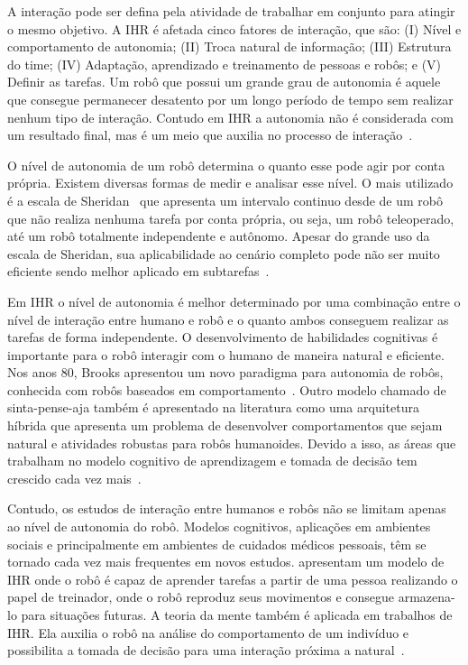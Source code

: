 A interação pode ser defina pela atividade de trabalhar em conjunto para atingir o mesmo objetivo. A IHR é afetada cinco fatores de interação, que são: (I) Nível e comportamento de autonomia; (II) Troca natural de informação; (III) Estrutura do time; (IV) Adaptação, aprendizado e treinamento de pessoas e robôs; e (V) Definir as tarefas. Um robô que possui um grande grau de autonomia é aquele que consegue permanecer desatento por um longo período de tempo sem realizar nenhum tipo de interação. Contudo em IHR a autonomia não é considerada com um resultado final, mas é um meio que auxilia no processo de interação~\cite{goodrich:2007, weiss:2010}.

O nível de autonomia de um robô determina o quanto esse pode agir por conta própria. Existem diversas formas de medir e analisar esse nível. O mais utilizado é a escala de Sheridan~\cite{sheridan:1978} que apresenta um intervalo continuo desde de um robô que não realiza nenhuma tarefa por conta própria, ou seja, um robô teleoperado, até um robô totalmente independente e autônomo. Apesar do grande uso da escala de Sheridan, sua aplicabilidade ao cenário completo pode não ser muito eficiente sendo melhor aplicado em subtarefas~\cite{goodrich:2007, weiss:2010}.

Em IHR o nível de autonomia é melhor determinado por uma combinação entre o nível de interação entre humano e robô e o quanto ambos conseguem realizar as tarefas de forma independente. O desenvolvimento de habilidades cognitivas é importante para o robô interagir com o humano de maneira natural e eficiente. Nos anos 80, Brooks apresentou um novo paradigma para autonomia de robôs, conhecida com robôs baseados em comportamento~\cite{brooks:1986, brooks:1991}. Outro modelo chamado de sinta-pense-aja também é apresentado na literatura como uma arquitetura híbrida que apresenta um problema de desenvolver comportamentos que sejam natural e atividades robustas para robôs humanoides. Devido a isso, as áreas que trabalham no modelo cognitivo de aprendizagem e tomada de decisão tem crescido cada vez mais~\cite{goodrich:2007}.

Contudo, os estudos de interação entre humanos e robôs não se limitam apenas ao nível de autonomia do robô. Modelos cognitivos, aplicações em ambientes sociais e principalmente em ambientes de cuidados médicos pessoais, têm se tornado cada vez mais frequentes em novos estudos.  apresentam um modelo de IHR onde o robô é capaz de aprender tarefas a partir de uma pessoa realizando o papel de treinador, onde o robô reproduz seus movimentos e consegue armazena-lo para situações futuras. A teoria da mente também é aplicada em trabalhos de IHR. Ela auxilia o robô na análise do comportamento de um indivíduo e possibilita a tomada de decisão para uma interação próxima a natural~\cite{hiatt:2011}.

